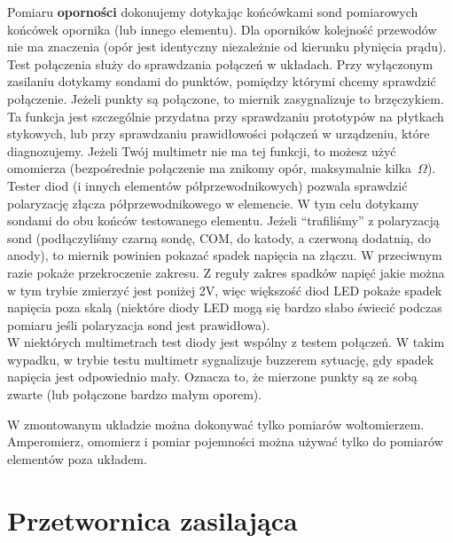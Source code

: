 \documentclass{pdfBooklets}
\begin{document}
Pomiaru \textbf{oporności} dokonujemy dotykając końcówkami sond pomiarowych końcówek opornika (lub innego elementu). Dla oporników kolejność przewodów nie ma znaczenia
(opór jest identyczny niezależnie od kierunku płynięcia prądu).
\\

Test połączenia służy do sprawdzania połączeń w układach. Przy wyłączonym zasilaniu dotykamy sondami do punktów, pomiędzy którymi chcemy
sprawdzić połączenie. Jeżeli punkty są połączone, to miernik zasygnalizuje to brzęczykiem. Ta funkcja jest szczególnie przydatna przy sprawdzaniu
prototypów na płytkach stykowych, lub przy sprawdzaniu prawidłowości połączeń w urządzeniu, które diagnozujemy. Jeżeli Twój
multimetr nie ma tej funkcji, to możesz użyć omomierza (bezpośrednie połączenie ma znikomy opór, maksymalnie kilka~$\Omega$).
\\

Tester diod (i innych elementów półprzewodnikowych) pozwala sprawdzić polaryzację złącza półprzewodnikowego w elemencie. W tym celu dotykamy
sondami do obu końców testowanego elementu. Jeżeli ``trafiliśmy'' z polaryzacją sond (podłączyliśmy czarną sondę, COM, do katody, a czerwoną
dodatnią, do anody), to miernik powinien pokazać spadek napięcia na złączu.
W przeciwnym razie pokaże przekroczenie zakresu. Z reguły zakres spadków napięć jakie można w tym trybie zmierzyć jest poniżej 2V, więc
większość diod LED pokaże spadek napięcia poza skalą (niektóre diody LED mogą się bardzo słabo świecić podczas pomiaru jeśli polaryzacja
sond jest prawidłowa).
\\

W niektórych multimetrach test diody jest wspólny z testem połączeń. W takim wypadku, w trybie testu multimetr sygnalizuje
buzzerem sytuację, gdy spadek napięcia jest odpowiednio mały. Oznacza to, że mierzone punkty są ze sobą zwarte
(lub połączone bardzo małym oporem).\\

\begin{ProTip}{}
  W zmontowanym układzie można dokonywać tylko pomiarów woltomierzem. Amperomierz, omomierz i pomiar pojemności można używać tylko do pomiarów elementów
  poza układem.
\end{ProTip}


\section{Przetwornica zasilająca}
\end{document}

